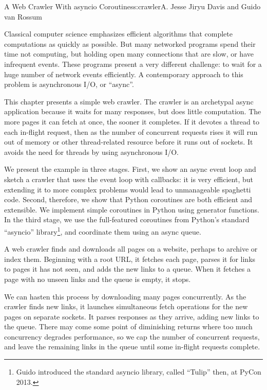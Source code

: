 \begin{aosachapter}{A Web Crawler With asyncio Coroutines}{s:crawler}{A. Jesse Jiryu Davis and Guido van Rossum}

Classical computer science emphasizes efficient algorithms that complete
computations as quickly as possible. But many networked programs spend
their time not computing, but holding open many connections that are
slow, or have infrequent events. These programs present a very different
challenge: to wait for a huge number of network events efficiently. A
contemporary approach to this problem is asynchronous I/O, or ``async''.

This chapter presents a simple web crawler. The crawler is an archetypal
async application because it waits for many responses, but does little
computation. The more pages it can fetch at once, the sooner it
completes. If it devotes a thread to each in-flight request, then as the
number of concurrent requests rises it will run out of memory or other
thread-related resource before it runs out of sockets. It avoids the
need for threads by using asynchronous I/O.

We present the example in three stages. First, we show an async event
loop and sketch a crawler that uses the event loop with callbacks: it is
very efficient, but extending it to more complex problems would lead to
unmanageable spaghetti code. Second, therefore, we show that Python
coroutines are both efficient and extensible. We implement simple
coroutines in Python using generator functions. In the third stage, we
use the full-featured coroutines from Python's standard ``asyncio''
library\footnote{Guido introduced the standard asyncio library, called
  ``Tulip'' then, at PyCon 2013.}, and coordinate them using an async
queue.

\label{the-task}

A web crawler finds and downloads all pages on a website, perhaps to
archive or index them. Beginning with a root URL, it fetches each page,
parses it for links to pages it has not seen, and adds the new links to
a queue. When it fetches a page with no unseen links and the queue is
empty, it stops.

We can hasten this process by downloading many pages concurrently. As
the crawler finds new links, it launches simultaneous fetch operations
for the new pages on separate sockets. It parses responses as they
arrive, adding new links to the queue. There may come some point of
diminishing returns where too much concurrency degrades performance, so
we cap the number of concurrent requests, and leave the remaining links
in the queue until some in-flight requests complete.


\end{aosachapter}
